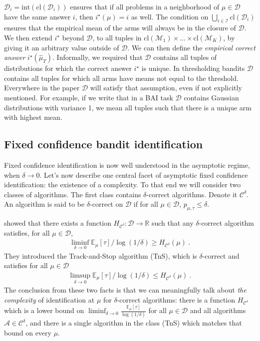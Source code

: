 \documentclass{article}
\begin{document}
$\mathcal D_i = \mathrm{int}(\mathrm{cl}(\mathcal D_i))$ ensures that if all problems in a neighborhood of $\mu \in \mathcal D$ have the same answer $i$, then $i^\star(\mu) = i$ as well.
The condition on $\bigcup_{i \in \mathcal I} \mathrm{cl}(\mathcal D_i)$ ensures that the empirical mean of the arms will always be in the closure of $\mathcal D$.
We then extend $i^\star$ beyond $\mathcal D$, to all tuples in $\mathrm{cl}(\mathcal M_1) \times \ldots \times \mathrm{cl}(\mathcal M_K)$, by giving it an arbitrary value outside of $\mathcal D$. We can then define the \emph{empirical correct answer} $i^\star(\hat{\mu}_T)$.
Informally, we required that $\mathcal D$ contains all tuples of distributions for which the correct answer $i^\star$ is unique.
In thresholding bandits $\mathcal D$ contains all tuples for which all arms have means not equal to the threshold.
Everywhere in the paper $\mathcal D$ will satisfy that assumption, even if not explicitly mentioned. For example, if we write that in a BAI task $\mathcal D$ contains Gaussian distributions with variance 1, we mean all tuples such that there is a unique arm with highest mean.

\subsection{Fixed confidence bandit identification}
\label{sub:fixed_confidence_bandit_identification}

Fixed confidence identification is now well understood in the asymptotic regime, when $\delta \to 0$. %
Let's now describe one central facet of asymptotic fixed confidence identification: the existence of a complexity.
To that end we will consider two classes of algorithms.
The first class contains $\delta$-correct algorithms. Denote it $\mathcal C^\delta$. An algorithm is said to be $\delta$-correct on $\mathcal D$ if for all $\mu \in \mathcal D$, $p_{\mu, \tau} \le \delta$.

\cite{garivier2016optimal} showed that there exists a function $H_{\mathcal C^{\delta}} : \mathcal D \to \mathbb{R}$ such that any $\delta$-correct algorithm satisfies, for all $\mu \in \mathcal D$,
\begin{align*}
\liminf_{\delta \to 0} \mathbb{E}_\mu[\tau]/\log(1/\delta) \ge H_{\mathcal C^\delta}(\mu) \: .
\end{align*}
They introduced the Track-and-Stop algorithm (TnS), which is $\delta$-correct and satisfies for all $\mu \in \mathcal D$
\begin{align*}
\limsup_{\delta \to 0} \mathbb{E}_\mu[\tau]/\log(1/\delta) \le H_{\mathcal C^\delta}(\mu) \: .
\end{align*}
The conclusion from these two facts is that we can meaningfully talk about \emph{the complexity} of identification at $\mu$ for $\delta$-correct algorithms: there is a function $H_{\mathcal C^\delta}$ which is a lower bound on $\liminf_{\delta \to 0} \frac{\mathbb{E}_\mu[\tau]}{\log(1/\delta)}$ for all $\mu \in \mathcal D$ and all algorithms $\mathcal A \in \mathcal C^\delta$, and there is a single algorithm in the class (TnS) which matches that bound on every $\mu$.
\end{document}
